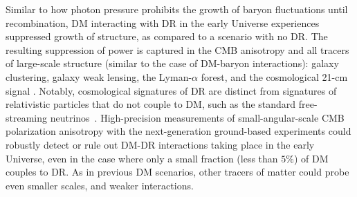 \documentclass[12pt]{article}
\begin{document}
Similar to how photon pressure prohibits the growth of baryon fluctuations until recombination, DM interacting with DR in the early Universe experiences suppressed growth of structure, as compared to a scenario with no DR. 
The resulting suppression of power is captured in the CMB anisotropy and all tracers of large-scale structure (similar to the case of DM-baryon interactions): galaxy clustering, galaxy weak lensing, the Lyman-$\alpha$ forest, and the cosmological 21-cm signal \cite{Boehm:2001hm,Cyr-Racine:2013fsa,Cyr-Racine:2015ihg}. 
Notably, cosmological signatures of DR are distinct from signatures of relativistic particles that do not couple to DM, such as the standard free-streaming neutrinos~\cite{Bashinsky:2003tk,Follin:2015hya,Baumann:2015rya}.
High-precision measurements of small-angular-scale CMB polarization anisotropy with the next-generation ground-based experiments could robustly detect or rule out DM-DR interactions taking place in the early Universe, even in the case where only a small fraction (less than $5\%$) of DM couples to DR. 
As in previous DM scenarios, other tracers of matter could probe even smaller scales, and weaker interactions. 

\vspace{-0.5cm}
\end{document}
